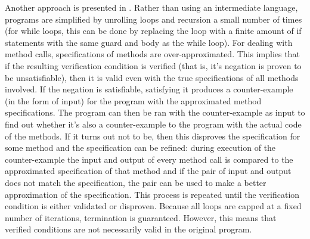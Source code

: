 \documentclass[a4paper, fleqn]{article}
\begin{document}
Another approach is presented in \cite{taghdiri2007}. Rather than using an intermediate language, programs are simplified by unrolling loops and recursion a small number of times (for while loops, this can be done by replacing the loop with a finite amount of if statements with the same guard and body as the while loop). For dealing with method calls, specifications of methods are over-approximated. This implies that if the resulting verification condition is verified (that is, it's negation is proven to be unsatisfiable), then it is valid even with the true specifications of all methods involved. If the negation is satisfiable, satisfying it produces a counter-example (in the form of input) for the program with the approximated method specifications. The program can then be ran with the counter-example as input to find out whether it's also a counter-example to the program with the actual code of the methods. If it turns out not to be, then this disproves the specification for some method and the specification can be refined: during execution of the counter-example the input and output of every method call is compared to the approximated specification of that method and if the pair of input and output does not match the specification, the pair can be used to make a better approximation of the specification. This process is repeated until the verification condition is either validated or disproven. Because all loops are capped at a fixed number of iterations, termination is guaranteed. However, this means that verified conditions are not necessarily valid in the original program.
\\\\
\end{document}
